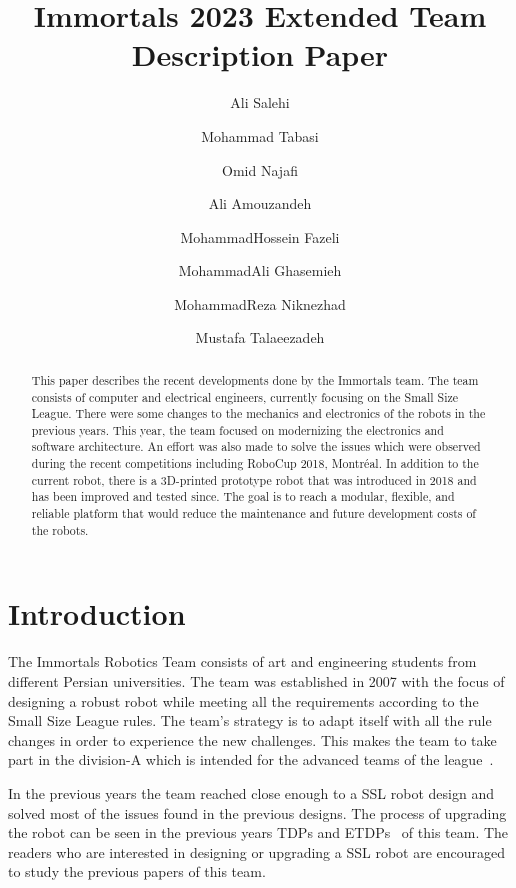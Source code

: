 \documentclass[runningheads]{llncs}
\begin{document}
%
\title{Immortals 2023 Extended Team Description Paper}
%
%
\author{Ali Salehi \and
Mohammad Tabasi \and
Omid Najafi \and
Ali Amouzandeh \and
MohammadHossein Fazeli \and
MohammadAli Ghasemieh \and
MohammadReza Niknezhad \and
Mustafa Talaeezadeh}
%
%
%
\maketitle              %
%
\begin{abstract}
This paper describes the recent developments done by the Immortals team. The team consists of computer and electrical engineers, currently focusing on the Small Size League. There were some changes to the mechanics and electronics of the robots in the previous years. This year, the team focused on modernizing the electronics and software architecture. An effort was also made to solve the issues which were observed during the recent competitions including RoboCup 2018, Montréal. In addition to the current robot, there is a 3D-printed prototype robot that was introduced in 2018 and has been improved and tested since. The goal is to reach a modular, flexible, and reliable platform that would reduce the maintenance and future development costs of the robots.

\end{abstract}
%
%
%
\section{Introduction}
The Immortals Robotics Team consists of art and engineering students from different Persian universities.
The team was established in 2007 with the focus of designing a robust robot while meeting all the requirements according to the Small Size League rules. The team's strategy is to adapt itself with all the rule changes in order to experience the new challenges. This makes the team to take part in the division-A which is intended for the advanced teams of the league~\cite{ref_website}.

In the previous years the team reached close enough to a SSL robot design and solved most of the issues found in the previous designs. The process of upgrading the robot can be seen in the previous years TDPs and ETDPs~\cite{ref_ETDP2019} of this team. The readers who are interested in designing or upgrading a SSL robot are encouraged to study the previous papers of this team.
\end{document}
